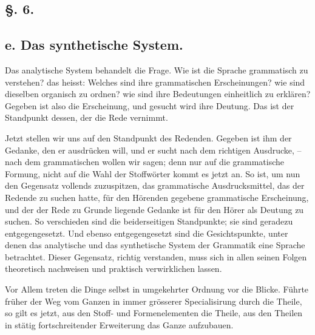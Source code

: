 \subsection*{§. 6.}\label{II.VI.6}
\subsection*{e. Das synthetische System.}

Das analytische System behandelt die Frage. Wie ist die Sprache grammatisch zu verstehen? das heisst: Welches sind ihre grammatischen Erscheinungen? wie sind dieselben organisch zu ordnen? wie sind ihre  Bedeutungen einheitlich zu erklären? Gegeben ist also die Erscheinung, und gesucht wird ihre Deutung. Das ist der Standpunkt dessen, der die Rede vernimmt.

Jetzt stellen wir uns auf den Standpunkt des Redenden. Gegeben ist ihm der Gedanke, den er ausdrücken will, und er sucht nach dem richtigen Ausdrucke, – nach dem grammatischen wollen wir sagen; denn nur auf die grammatische Formung, nicht auf die Wahl der Stoffwörter kommt es jetzt an. So ist, um nun den Gegensatz vollends zuzuspitzen, das grammatische Ausdrucksmittel, das der Redende zu suchen hatte, für den Hörenden gegebene grammatische Erscheinung, und der der Rede zu Grunde liegende Gedanke ist für den Hörer als Deutung zu suchen. So verschieden sind die beiderseitigen Stand\label{sp.94}punkte; sie sind geradezu entgegengesetzt. Und ebenso entgegengesetzt sind die Gesichtspunkte, unter denen das analytische und das synthetische System der Grammatik eine Sprache betrachtet. Dieser Gegensatz, richtig verstanden, muss sich in allen seinen Folgen theoretisch nachweisen und praktisch verwirklichen lassen.

Vor Allem treten die Dinge selbst in umgekehrter Ordnung vor die Blicke. Führte früher der Weg vom Ganzen in immer grösserer Specialisirung durch die Theile, so gilt es jetzt, aus den Stoff- und Formenelementen die Theile, aus den Theilen in stätig fortschreitender Erweiterung das Ganze aufzubauen.

